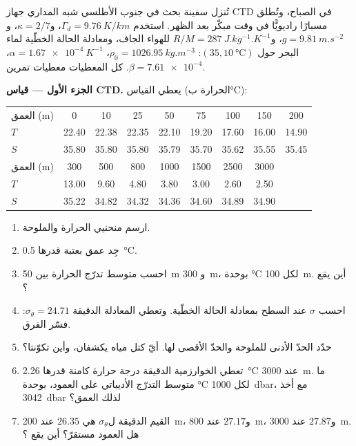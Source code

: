 \begin{problem}
\label{pb:b1:fluid-envelopes-structure:1}
تُنزل سفينة بحث في جنوب الأطلسي شبه المداري جهاز CTD في الصباح، وتُطلق مسبارًا راديويًّا في وقت مبكّر بعد الظهر. استخدم $\Gamma_d =
\qty{9.76}{K/km}$، و$\kappa = 2/7$، و$g = \qty{9.81}{m.s^{-2}}$، و$R/M =
\qty{287}{J.kg^{-1}.K^{-1}}$ للهواء الجاف، ومعادلة الحالة الخطّية لماء البحر حول $(35, \qty{10}{\celsius})$: $\rho_0 = \qty{1026.95}{kg.m^{-3}}$،
$\alpha = \qty{1.67e-4}{K^{-1}}$، $\beta = \num{7.61e-4}$. كل المعطيات معطيات تمرين.

\medskip
\noindent\textbf{الجزء الأول --- قياس CTD.} يعطي القياس (الحرارة ب\si{\celsius}):
\begin{center}
\small
\setlength{\tabcolsep}{3pt}
\begin{tabular}{|l|*{8}{c}|}
\hline
العمق (m) & 0 & 10 & 25 & 50 & 75 & 100 & 150 & 200 \\
$T$ & 22.40 & 22.38 & 22.35 & 22.10 & 19.20 & 17.60 & 16.00 & 14.90 \\
$S$ & 35.80 & 35.80 & 35.80 & 35.79 & 35.70 & 35.62 & 35.55 & 35.45 \\
\hline
العمق (m) & 300 & 500 & 800 & 1000 & 1500 & 2500 & 3000 & \\
$T$ & 13.00 & 9.60 & 4.80 & 3.80 & 3.00 & 2.60 & 2.50 & \\
$S$ & 35.22 & 34.82 & 34.32 & 34.36 & 34.60 & 34.89 & 34.90 & \\
\hline
\end{tabular}
\end{center}
\begin{enumerate}
  \item ارسم منحنيي الحرارة والملوحة.
  \item جِد عمق  بعتبة قدرها \qty{0.5}{\celsius}.
  \item احسب متوسط تدرّج الحرارة بين \qty{50}{m} و
        \qty{300}{m}، بوحدة \si{\celsius} لكل \qty{100}{m}. أين يقع ؟
  \item احسب $\sigma$ عند السطح بمعادلة الحالة الخطّية. وتعطي المعادلة الدقيقة $\sigma_\theta = 24.71$: فسّر الفرق.
  \item حدّد الحدّ الأدنى للملوحة والحدّ الأقصى لها. أيّ كتل مياه يكشفان، وأين تكوّنتا؟
  \item تعطي الخوارزمية الدقيقة درجة حرارة كامنة قدرها \qty{2.26}{\celsius} عند \qty{3000}{m}. ما متوسط التدرّج الأديباتي على العمود، بوحدة \si{\celsius} لكل \qty{1000}{dbar}، مع أخذ \qty{3042}{dbar} لذلك العمق؟
  \item القيم الدقيقة ل$\sigma_\theta$ هي $26.35$ عند \qty{200}{m}، و$27.17$ عند \qty{800}{m}، و$27.87$ عند \qty{3000}{m}. هل العمود مستقرّ؟ أين يقع ؟
\end{enumerate}


\end{problem}
